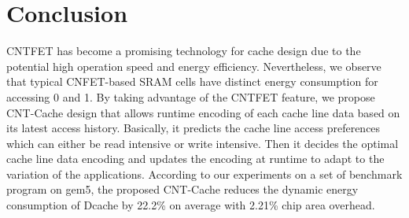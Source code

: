 \section{Conclusion} \label{sec:conclusion}
CNTFET has become a promising technology for cache design due to the 
potential high operation speed and energy efficiency. Nevertheless, we 
observe that typical CNFET-based SRAM cells have distinct energy consumption 
for accessing 0 and 1. By taking advantage of the CNTFET feature, we propose 
CNT-Cache design that allows runtime encoding of each cache line data based on 
its latest access history. Basically, it predicts the cache line access 
preferences which can either be read intensive or write intensive. Then it 
decides the optimal cache line data encoding and updates the encoding at 
runtime to adapt to the variation of the applications. According to our 
experiments on a set of benchmark program on gem5, the proposed CNT-Cache 
reduces the dynamic energy consumption of Dcache by 22.2\% on average with 
2.21\% chip area overhead.
